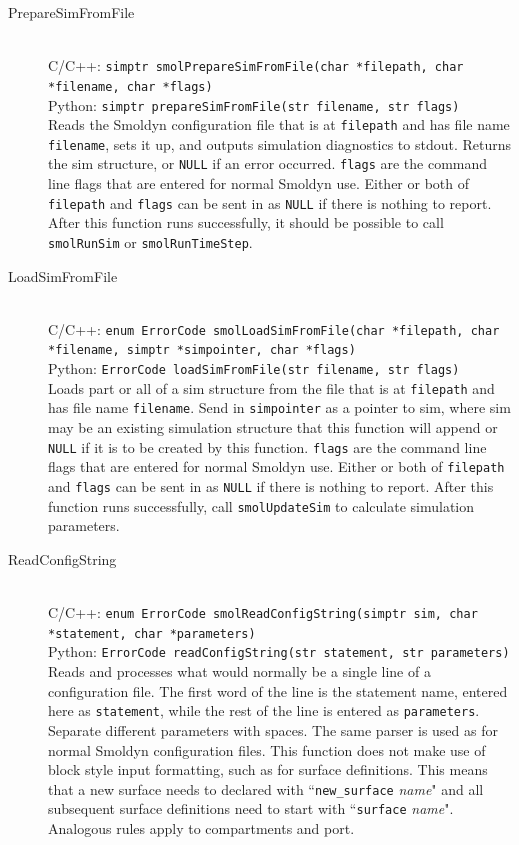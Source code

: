\documentclass {book}
\newcommand {\ttt} {\texttt}
\begin{document}
\begin{description}

\item[PrepareSimFromFile]
\hfill \\
C/C++: \ttt{simptr smolPrepareSimFromFile(char *filepath, char *filename, char *flags)}\\
Python: \ttt{simptr prepareSimFromFile(str filename, str flags)}\\
Reads the Smoldyn configuration file that is at \ttt{filepath} and has file name \ttt{filename}, sets it up, and outputs simulation diagnostics to stdout. Returns the sim structure, or \ttt{NULL} if an error occurred. \ttt{flags} are the command line flags that are entered for normal Smoldyn use. Either or both of \ttt{filepath} and \ttt{flags} can be sent in as \ttt{NULL} if there is nothing to report. After this function runs successfully, it should be possible to call \ttt{smolRunSim} or \ttt{smolRunTimeStep}.

\item[LoadSimFromFile]
\hfill \\
C/C++: \ttt{enum ErrorCode smolLoadSimFromFile(char *filepath, char *filename, simptr *simpointer, char *flags)}\\
Python: \ttt{ErrorCode loadSimFromFile(str filename, str flags)}\\
Loads part or all of a sim structure from the file that is at \ttt{filepath} and has file name \ttt{filename}. Send in \ttt{simpointer} as a pointer to sim, where sim may be an existing simulation structure that this function will append or \ttt{NULL} if it is to be created by this function. \ttt{flags} are the command line flags that are entered for normal Smoldyn use. Either or both of \ttt{filepath} and \ttt{flags} can be sent in as \ttt{NULL} if there is nothing to report. After this function runs successfully, call \ttt{smolUpdateSim} to calculate simulation parameters.

\item[ReadConfigString]
\hfill \\
C/C++: \ttt{enum ErrorCode smolReadConfigString(simptr sim, char *statement, char *parameters)}\\
Python: \ttt{ErrorCode readConfigString(str statement, str parameters)}\\
Reads and processes what would normally be a single line of a configuration file. The first word of the line is the statement name, entered here as \ttt{statement}, while the rest of the line is entered as \ttt{parameters}. Separate different parameters with spaces. The same parser is used as for normal Smoldyn configuration files. This function does not make use of block style input formatting, such as for surface definitions. This means that a new surface needs to declared with ``\ttt{new\_surface} \emph{name}" and all subsequent surface definitions need to start with ``\ttt{surface} \emph{name}". Analogous rules apply to compartments and port.

\end{description}
\end{document}
